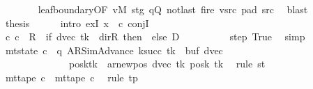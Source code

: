 \begin{isabellebody}
\ \ \ \ \ \ \isamarkupfalse%
\ leaf{\isacharunderscore}{\kern0pt}boundary{\isacharbrackleft}{\kern0pt}OF\ vM\ stg\ qQ\ notlast\ fire\ vsrc{}\ pad{}\ src{}{\isacharbrackright}{\kern0pt}\ \isamarkupfalse%
\ blast\isanewline
\ \ \ \ \isamarkupfalse%
\ {\isacharquery}{\kern0pt}thesis\isanewline
\ \ \ \ \isamarkupfalse%
\ {\isacharparenleft}{\kern0pt}intro\ exI{\isacharbrackleft}{\kern0pt}\ x\ {\isacharequal}{\kern0pt}\ c{\isacharprime}{\kern0pt}{\isacharbrackright}{\kern0pt}\ conjI{\isacharparenright}{\kern0pt}\isanewline
\ \ \ \ \ \ \isamarkupfalse%
\ {\isachardoublequoteopen}{\isacharparenleft}{\kern0pt}c{}{\isacharcomma}{\kern0pt}\ c{\isacharprime}{\kern0pt}{\isacharparenright}{\kern0pt}\ {\isasymin}\ {\isacharquery}{\kern0pt}R\ {\isacharcircum}{\kern0pt}{\isacharcircum}{\kern0pt}\ {\isacharparenleft}{\kern0pt}if\ dvec\ tk\ {\isacharequal}{\kern0pt}\ dir{\isachardot}{\kern0pt}R\ then\ {}\ else\ {\isacharquery}{\kern0pt}D{\isacharparenright}{\kern0pt}{\isachardoublequoteclose}\isanewline
\ \ \ \ \ \ \ \ \isamarkupfalse%
\ step\ True\ \isamarkupfalse%
\ simp\isanewline
\ \ \ \ \ \ \isamarkupfalse%
\ {\isachardoublequoteopen}mt{\isacharunderscore}{\kern0pt}state\ c{\isacharprime}{\kern0pt}\ {\isacharequal}{\kern0pt}\ {\isacharparenleft}{\kern0pt}q{\isacharcomma}{\kern0pt}\ AR{\isacharunderscore}{\kern0pt}SimAdvance{\isacharcomma}{\kern0pt}\ k{\isacharunderscore}{\kern0pt}succ\ tk{\isacharcomma}{\kern0pt}\ {}{\isacharcomma}{\kern0pt}\ buf{\isacharcomma}{\kern0pt}\ dvec{\isacharcomma}{\kern0pt}\isanewline
\ \ \ \ \ \ \ \ \ \ \ \ \ \ posk{\isacharparenleft}{\kern0pt}tk\ {\isacharcolon}{\kern0pt}{\isacharequal}{\kern0pt}\ ar{\isacharunderscore}{\kern0pt}newpos\ {\isacharparenleft}{\kern0pt}dvec\ tk{\isacharparenright}{\kern0pt}\ {\isacharparenleft}{\kern0pt}posk\ tk{\isacharparenright}{\kern0pt}{\isacharparenright}{\kern0pt}{\isacharparenright}{\kern0pt}{\isachardoublequoteclose}\ \isamarkupfalse%
\ {\isacharparenleft}{\kern0pt}rule\ st{\isacharparenright}{\kern0pt}\isanewline
\ \ \ \ \ \ \isamarkupfalse%
\ {\isachardoublequoteopen}mt{\isacharunderscore}{\kern0pt}tape\ c{\isacharprime}{\kern0pt}\ {\isacharequal}{\kern0pt}\ mt{\isacharunderscore}{\kern0pt}tape\ c{}{\isachardoublequoteclose}\ \isamarkupfalse%
\ {\isacharparenleft}{\kern0pt}rule\ tp{\isacharparenright}{\kern0pt}\isanewline

\end{isabellebody}
